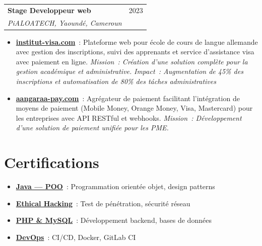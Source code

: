 \documentclass[12pt, a4paper]{article}
\begin{document}
\vspace{6pt}
\noindent\begin{tabularx}{\linewidth}{@{}X r@{}}
  {\bfseries\color{primary}Stage Developpeur web} &
  {\small\textcolor{textgray}{2023}} \\
  {\itshape\color{textgray}PiALOATECH, Yaound\'e, Cameroun} & \\
\end{tabularx}
\begin{itemize}[leftmargin=1.4em, itemsep=1pt, topsep=2pt, parsep=0pt]
  \item \href{https://institut-visa.com/}{\textbf{institut-visa.com}}~: Plateforme web pour \'ecole de cours de langue allemande avec gestion des inscriptions, suivi des apprenants et service d'assistance visa avec paiement en ligne. \textit{Mission~: Cr\'eation d'une solution compl\`ete pour la gestion acad\'emique et administrative.} \textit{Impact~: Augmentation de 45\% des inscriptions et automatisation de 80\% des t\'aches administratives}
  \item \href{https://aangaraa-pay.com/}{\textbf{aangaraa-pay.com}}~: Agr\'egateur de paiement facilitant l'int\'egration de moyens de paiement (Mobile Money, Orange Money, Visa, Mastercard) pour les entreprises avec API RESTful et webhooks. \textit{Mission~: D\'eveloppement d'une solution de paiement unifi\'ee pour les PME.}
\end{itemize}

\section{Certifications}

\begin{itemize}[leftmargin=1.4em, itemsep=1pt, topsep=2pt, parsep=0pt]
  \item \href{https://ude.my/UC-41275521-f919-4f97-8a8b-3cd39850f307}{\textbf{Java --- POO}}~: Programmation orient\'ee objet, design patterns
  \item \href{https://ude.my/UC-28973039-144f-4a55-8ad1-03d228dbc5f5}{\textbf{Ethical Hacking}}~: Test de p\'en\'etration, s\'ecurit\'e r\'eseau
  \item \href{https://ude.my/UC-01418bd3-a427-4926-8b06-74444c240ca3}{\textbf{PHP \& MySQL}}~: D\'eveloppement backend, bases de donn\'ees
  \item \href{https://www.udemy.com/certificate/UC-81a3e6ea-8378-444d-a94c-38f8d830abe1/}{\textbf{DevOps}}~: CI/CD, Docker, GitLab CI
\end{itemize}
\end{document}
